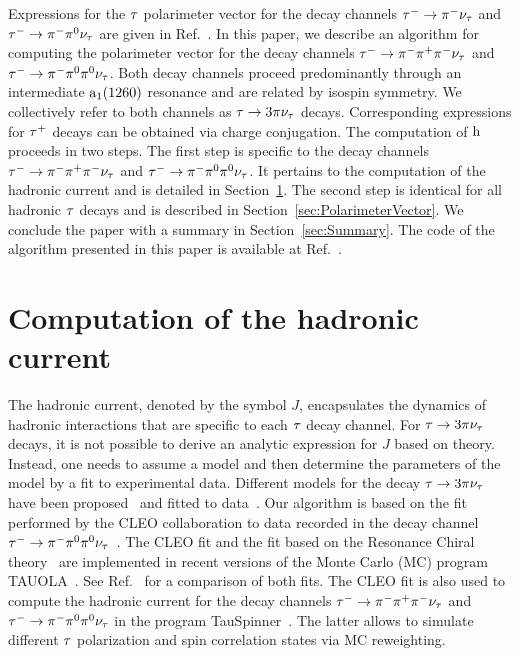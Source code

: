 Expressions for the $\tau$ polarimeter vector for the decay channels $\tau^{-} \to \pi^{-}\nu_{\tau}$ and $\tau^{-} \to \pi^{-}\pi^{\textrm{0}}\nu_{\tau}$ are given in Ref.~\cite{Jadach:1990mz}. 
In this paper, we describe an algorithm for computing the polarimeter vector for the decay channels $\tau^{-} \to \pi^{-}\pi^{+}\pi^{-}\nu_{\tau}$ and $\tau^{-} \to \pi^{-}\pi^{\textrm{0}}\pi^{\textrm{0}}\nu_{\tau}$. Both decay channels proceed predominantly through an intermediate $\textrm{a}_{1}\textrm{(1260)}$ resonance and are related by isospin symmetry.
We collectively refer to both channels as $\tau \to 3 \pi\nu_{\tau}$ decays.
Corresponding expressions for $\tau^{+}$ decays can be obtained via charge conjugation.
The computation of $\textrm{h}$ proceeds in two steps. The first step is specific to the decay channels $\tau^{-} \to \pi^{-}\pi^{+}\pi^{-}\nu_{\tau}$ and $\tau^{-} \to \pi^{-}\pi^{\textrm{0}}\pi^{\textrm{0}}\nu_{\tau}$. It pertains to the computation of the hadronic current and is detailed in Section~\ref{sec:HadronicCurrent}.
The second step is identical for all hadronic $\tau$ decays and is described in Section~\ref{sec:PolarimeterVector}.
We conclude the paper with a summary in Section~\ref{sec:Summary}.
\ifx\ver\verPreprint
The code of the algorithm presented in this paper is available at Ref.~\cite{christian_veelken_2023_8113344}.
\fi

\section{Computation of the hadronic current}
\label{sec:HadronicCurrent}

The hadronic current, denoted by the symbol $J$, encapsulates the dynamics of hadronic interactions that are specific to each $\tau$ decay channel.
For $\tau \to 3 \pi\nu_{\tau}$ decays,
it is not possible to derive an analytic expression for $J$ based on theory.
Instead, one needs to assume a model and then determine the parameters of the model by a fit to experimental data.
Different models for the decay $\tau \to 3 \pi\nu_{\tau}$ have been proposed~\cite{Bowler:1988kf,Isgur:1988vm,Kuhn:1990ad,Feindt:1990ev,Kuhn:1992nz,GomezDumm:2003ku,Dumm:2009va} and fitted to data~\cite{ARGUS:1992olh,OPAL:1997was,DELPHI:1998bhv,Shekhovtsova:2012ra,Nugent:2013hxa}.
Our algorithm is based on the fit performed by the CLEO collaboration to data recorded in the decay channel $\tau^{-} \to \pi^{-}\pi^{\textrm{0}}\pi^{\textrm{0}}\nu_{\tau}$~\cite{CLEO:1999rzk}.
{\color{blue} The CLEO fit and the fit based on the Resonance Chiral theory~\cite{GomezDumm:2003ku,Dumm:2009va,Ecker:1988te,Ecker:1989yg} are implemented in recent versions of the Monte Carlo (MC) program \textsc{TAUOLA}~\cite{Jadach:1990mz,Shekhovtsova:2012ra,Nugent:2013hxa}. See Ref.~\cite{Was:2015laa} for a comparison of both fits. The CLEO fit is also used to compute the hadronic current for the decay channels $\tau^{-} \to \pi^{-}\pi^{+}\pi^{-}\nu_{\tau}$ and $\tau^{-} \to \pi^{-}\pi^{\textrm{0}}\pi^{\textrm{0}}\nu_{\tau}$ in the program TauSpinner~\cite{Czyczula:2012ny}. The latter allows to simulate different $\tau$ polarization and spin correlation states via MC reweighting}.

